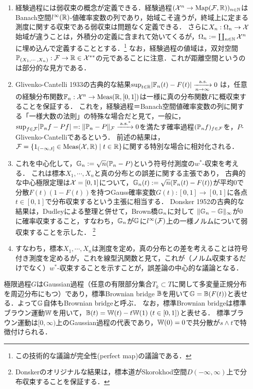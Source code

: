 \documentclass[uplatex,dvipdfmx]{jsreport}
\begin{document}
\begin{enumerate}
    \item 経験過程には弱収束の概念が定義できる．経験過程$(\mathcal{X}^n\to\mathrm{Map}(\mathcal{F},\mathbb{R}))_{n\in\mathbb{N}}$はBanach空間$l^\infty(\mathbb{R})$-値確率変数の列であり，始域こそ違うが，終域上に定まる測度に関する収束である弱収束は問題なく定義できる．
    さらに$X_n:\Omega_n\to\mathcal{X}$始域が違うことは，外積分の定義に含まれて効いてくるが，$\Omega_n:=\coprod_{n\in\mathbb{N}}\mathcal{X}^n$に埋め込んで定義することとする．\footnote{この技術的な議論が完全性(perfect map)の議論である．}
    なお，経験過程の値域は，双対空間$\mathbb{P}_{(X_1,\cdots,X_n)}:\mathcal{F}\to\mathbb{R}\in\mathcal{X}^{**}$の元であることに注意．これが距離空間というのは部分的な見方である．
    \item Glivenko-Cantelli 1933の古典的な結果$\sup_{t\in\mathbb{R}}\lvert\mathbb{F}_n(t)-F(t)\rvert\xrightarrow[n\to\infty]{\;\mathrm{a.s.}}0$
    は，任意の経験分布関数$\mathbb{F}_n:\mathcal{X}^n\to\mathrm{Meas}(\mathbb{R},[0,1])$は一様に真の分布関数$F$に概収束することを保証する．
    これを，経験過程＝Banach空間値確率変数の列に関する「一様大数の法則」の特殊な場合だと見て，一般に，$\sup_{f\in\mathcal{F}}\lvert\mathbb{P}_nf-Pf\rvert=:\|\mathbb{P}_n-P\|_{\mathcal{F}}\xrightarrow{\;\mathrm{a.s.}^*}0$を満たす確率過程$(\mathbb{P}_nf)_{f\in\mathcal{F}}$を，$P$-Glivenko-Cantelliであるという．
    前述の結果は，$\mathcal{F}=\{1_{(-\infty,t]}\in\mathrm{Meas}(\mathcal{X},\mathbb{R})\mid t\in\mathbb{R}\}$に関する特別な場合に相対化される．
    \item これを中心化して，$\mathbb{G}_n:=\sqrt{n}(\mathbb{P}_n-P)$という符号付測度の$w^*$-収束を考える．
    これは標本$X_1,\cdots,X_n$と真の分布との誤差に関する主張であり，
    古典的な中心極限定理は$\mathcal{X}=[0,1]$について，$\mathbb{G}_n(t):=\sqrt{n}(\mathbb{F}_n(t)-F(t))$が平均$0$で分散$F(t)(1-F(t))$を持つGauss確率変数$G(t):[0,1]\to[0,1]$に各点$t\in[0,1]$で分布収束するという主張に相当する．
    Donsker 1952の古典的な結果は，Dudleyによる整理と併せて，Brown橋$\mathbb{G}_n$に対して
    $\|\mathbb{G}_n-\mathbb{G}\|_\infty$が$0$に確率収束すること，すなわち，$\mathbb{G}_n$が$\mathbb{G}$に$l^\infty(\mathcal{F})$上の一様ノルムについて弱収束することを示した．
    \footnote{Donskerのオリジナルな結果は，標本道がSkorokhod空間$D(-\infty,\infty)$上で分布収束することを保証する．}
    \item すなわち，標本$X_1,\cdots,X_n$は測度を定め，真の分布との差を考えることは符号付き測度を定めるが，これを線型汎関数と見て，これが（ノルム収束するだけでなく）$w^*$-収束することを示すことが，誤差論の中心的な議論となる．
\end{enumerate}

\begin{discussion}
    極限過程$G$はGaussian過程（任意の有限部分集合$T_k\subset T$に関して多変量正規分布を周辺分布にもつ）であり，標準Brownian bridge $\mathbb{B}$を用いて$\mathbb{G}=\mathbb{B}(F(t))$と表せる．よって$\mathbb{G}$自体もBrownian bridgeと呼ぶ．
    なお，標準Brownian bridgeは標準ブラウン運動$\mathbb{W}$を用いて，$\mathbb{B}(t)=\mathbb{W}(t)-t\mathbb{W}(1)\;(t\in[0,1])$と表せる．
    標準ブラウン運動は$[0,\infty)$上のGaussian過程の代表であり，$\mathbb{W}(0)=0$で共分散が$s\land t$で特徴付けられる．
\end{discussion}
\end{document}
